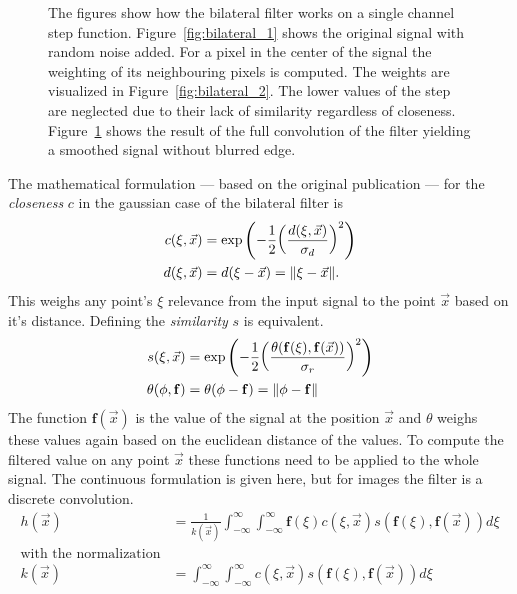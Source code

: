 \begin{figure}[H]
\begin{subfigure}[b]{0.3\linewidth}
        \caption{}\label{fig:bilateral_3}
    \end{subfigure}
    \caption{The figures show how the bilateral filter works on a single channel step function. Figure~\ref{fig:bilateral_1} shows the original signal with random noise added. For a pixel in the center of the signal the weighting of its neighbouring pixels is computed. The weights are visualized in Figure~\ref{fig:bilateral_2}. The lower values of the step are neglected due to their lack of similarity regardless of closeness. Figure~\ref{fig:bilateral_3} shows the result of the full convolution of the filter yielding a smoothed signal without blurred edge.}\label{fig:bilateral_filter}
\end{figure}
The mathematical formulation --- based on the original publication --- for the \emph{closeness} $c$ in the gaussian case of the bilateral filter is
\begin{equation}
\begin{aligned}
    c(\xi, \vec{x})&= \exp\left(-\frac{1}{2}{\left(\frac{d(\xi, \vec{x})}{\sigma_d} \right)}^2 \right) \\
    d(\xi, \vec{x})&= d(\xi - \vec{x}) = \lVert\xi - \vec{x}\rVert \text{.}
\end{aligned}
\end{equation}
This weighs any point's $\xi$ relevance from the input signal to the point $\vec{x}$ based on it's distance.
Defining the \emph{similarity} $s$ is equivalent.
\begin{equation}
\begin{aligned}
    s(\xi, \vec{x})&= \exp\left(-\frac{1}{2}{\left(\frac{\theta(\mathbf{f}(\xi), \mathbf{f}(\vec{x}))}{\sigma_r}\right)}^2\right) \\
    \theta(\phi, \mathbf{f})&= \theta(\phi - \mathbf{f}) = \lVert\phi - \mathbf{f}\rVert
\end{aligned}
\end{equation}
The function $\mathbf{f}(\vec{x})$ is the value of the signal at the position $\vec{x}$ and $\theta$ weighs these values again based on the euclidean distance of the values.
To compute the filtered value on any point $\vec{x}$ these functions need to be applied to the whole signal.
The continuous formulation is given here, but for images the filter is a discrete convolution.
\begin{equation}
\begin{aligned}
    h(\vec{x}) &= \frac{1}{k(\vec{x})} \int_{-\infty}^{\infty} \int_{-\infty}^{\infty} \mathbf{f}(\xi) c(\xi, \vec{x}) s(\mathbf{f}(\xi), \mathbf{f}(\vec{x})) d\xi \\
    \text{with the normalization} \\
    k(\vec{x}) &= \int_{-\infty}^{\infty} \int_{-\infty}^{\infty} c(\xi, \vec{x}) s(\mathbf{f}(\xi), \mathbf{f}(\vec{x})) d\xi
\end{aligned}
\end{equation}
